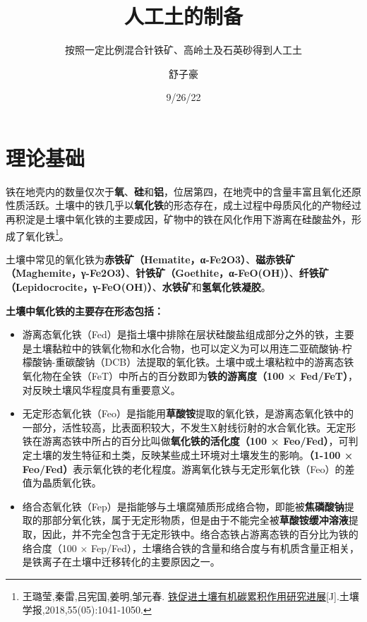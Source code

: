 \documentclass[
  letterpaper,
  DIV=11,
  numbers=noendperiod]{scrartcl}
\title{人工土的制备}
\subtitle{按照一定比例混合针铁矿、高岭土及石英砂得到人工土}
\author{舒子豪}
\date{9/26/22}
\begin{document}
\maketitle
\ifdefined\Shaded\renewenvironment{Shaded}{\begin{tcolorbox}[frame hidden, enhanced, interior hidden, boxrule=0pt, breakable, borderline west={3pt}{0pt}{shadecolor}, sharp corners]}{\end{tcolorbox}}\fi

\hypertarget{ux7406ux8bbaux57faux7840}{%
\section{理论基础}\label{ux7406ux8bbaux57faux7840}}

铁在地壳内的数量仅次于\textbf{氧}、\textbf{硅}和\textbf{铝}，位居第四，在地壳中的含量丰富且氧化还原性质活跃。土壤中的铁几乎以\textbf{氧化铁}的形态存在，成土过程中母质风化的产物经过再积淀是土壤中氧化铁的主要成因，矿物中的铁在风化作用下游离在硅酸盐外，形成了氧化铁\footnote{王璐莹,秦雷,吕宪国,姜明,邹元春.
  \href{https://kns.cnki.net/kcms/detail/detail.aspx?dbcode=CJFD\&dbname=CJFDLAST2018\&filename=TRXB201805001\&uniplatform=NZKPT\&v=S6JMDESWy88roKn6cxwfV1jDuxaPt_WUctWqUfpeOvB47_1Lnx2A4hxIoPX5gcWI}{铁促进土壤有机碳累积作用研究进展}{[}J{]}.土壤学报,2018,55(05):1041-1050.}。

土壤中常见的氧化铁为\textbf{赤铁矿（Hematite，α-Fe2O3）}、\textbf{磁赤铁矿（Maghemite，γ-Fe2O3）}、\textbf{针铁矿（Goethite，α-FeO(OH)）}、\textbf{纤铁矿（Lepidocrocite，γ-FeO(OH)）}、\textbf{水铁矿}和\textbf{氢氧化铁凝胶}。

\textbf{土壤中氧化铁的主要存在形态包括：}

\begin{itemize}
\item
  游离态氧化铁（Fed）是指土壤中排除在层状硅酸盐组成部分之外的铁，主要是土壤黏粒中的铁氧化物和水化合物，也可以定义为可以用连二亚硫酸钠-柠檬酸钠-重碳酸钠（DCB）法提取的氧化铁。土壤中或土壤粘粒中的游离态铁氧化物在全铁（FeT）中所占的百分数即为\textbf{铁的游离度（100
  × Fed/FeT）}，对反映土壤风华程度具有重要意义。
\item
  无定形态氧化铁（Feo）是指能用\textbf{草酸铵}提取的氧化铁，是游离态氧化铁中的一部分，活性较高，比表面积较大，不发生X射线衍射的水合氧化铁。无定形铁在游离态铁中所占的百分比叫做\textbf{氧化铁的活化度（100
  ×
  Feo/Fed）}，可判定土壤的发生特征和土类，反映某些成土环境对土壤发生的影响。\textbf{（1-100
  ×
  Feo/Fed）}表示氧化铁的老化程度。游离氧化铁与无定形氧化铁（Feo）的差值为晶质氧化铁。
\item
  络合态氧化铁（Fep）是指能够与土壤腐殖质形成络合物，即能被\textbf{焦磷酸钠}提取的那部分氧化铁，属于无定形物质，但是由于不能完全被\textbf{草酸铵缓冲溶液}提取，因此，并不完全包含于无定形铁中。络合态铁占游离态铁的百分比为铁的络合度（100
  ×
  Fep/Fed），土壤络合铁的含量和络合度与有机质含量正相关，是铁离子在土壤中迁移转化的主要原因之一。
\end{itemize}
\end{document}
